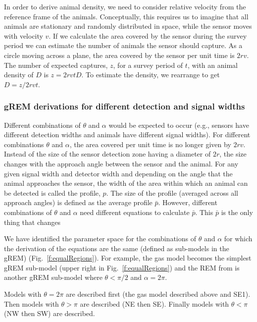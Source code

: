 


In order to derive animal density, we need to consider relative velocity from the reference frame of the animals. Conceptually, this requires us to imagine that all animals are stationary and randomly distributed in space, while the sensor moves with velocity $v$. If we calculate the area covered by the sensor during the survey period we can estimate the number of animals the sensor should capture. As a circle moving across a plane, the area covered by the sensor per unit time is $2rv$. The number of expected captures, $z$, for a survey period of $t$, with an animal density of $D$ is $z = 2rvtD$. To estimate the density, we rearrange to get $D = z/2rvt$.

\subsubsection{gREM derivations for different detection and signal widths}
Different combinations of $\theta$ and $\alpha$ would be expected to occur (e.g., sensors have different detection widths and animals have different signal widths). For different combinations $\theta$ and $\alpha$, the area covered per unit time is no longer given by $2rv$. Instead of the size of the sensor detection zone having a diameter of $2r$, the size changes with the approach angle between the sensor and the animal. For any given signal width and detector width and depending on the angle that the animal approaches the sensor, the width of the area within which an animal can be detected is called the profile, $p$. The size of the profile (averaged across all approach angles) is defined as the average profile $\bar{p}$. However, different combinations of $\theta$ and $\alpha$ need different equations to calculate $\bar{p}$. This $\bar{p}$ is the only thing that changes 

We have identified the parameter space for the combinations of $\theta$ and $\alpha$ for which the derivation of the equations are the same (defined as sub-models in the gREM) (Fig.~\ref{f:equalRegions}). For example, the gas model becomes the simplest gREM sub-model (upper right in Fig.~\ref{f:equalRegions}) and the REM from \citep{rowcliffe2008estimating} is another gREM sub-model where $\theta<\pi/2$ and $\alpha = 2\pi$.

Models with $\theta = 2\pi$ are described first (the gas model described above and SE1). Then models with $\theta > \pi$ are described (NE then SE). Finally models with $\theta < \pi$ (NW then SW) are described. 


